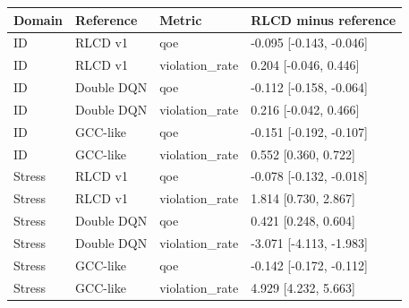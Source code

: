 \begin{tabular}{llll}
\toprule
Domain & Reference & Metric & RLCD minus reference \\
\midrule
ID & RLCD v1 & qoe & -0.095 [-0.143, -0.046] \\
ID & RLCD v1 & violation\_rate & 0.204 [-0.046, 0.446] \\
ID & Double DQN & qoe & -0.112 [-0.158, -0.064] \\
ID & Double DQN & violation\_rate & 0.216 [-0.042, 0.466] \\
ID & GCC-like & qoe & -0.151 [-0.192, -0.107] \\
ID & GCC-like & violation\_rate & 0.552 [0.360, 0.722] \\
Stress & RLCD v1 & qoe & -0.078 [-0.132, -0.018] \\
Stress & RLCD v1 & violation\_rate & 1.814 [0.730, 2.867] \\
Stress & Double DQN & qoe & 0.421 [0.248, 0.604] \\
Stress & Double DQN & violation\_rate & -3.071 [-4.113, -1.983] \\
Stress & GCC-like & qoe & -0.142 [-0.172, -0.112] \\
Stress & GCC-like & violation\_rate & 4.929 [4.232, 5.663] \\
\bottomrule
\end{tabular}
